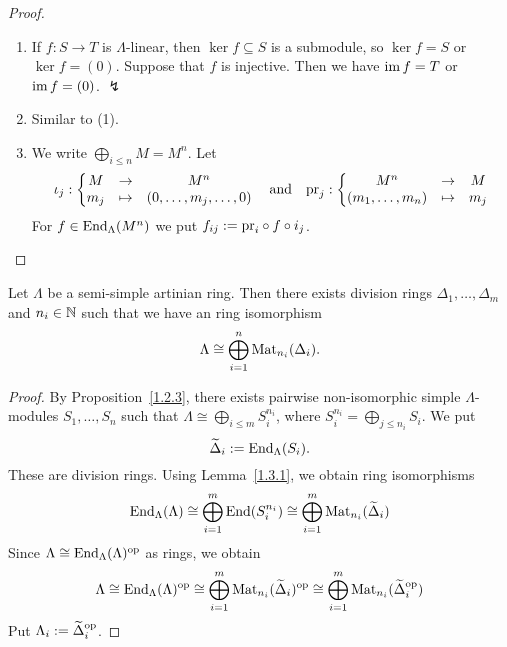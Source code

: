 
\begin{proof}\
\begin{enumerate}
\item If $f:S\to T$ is $\Lambda$-linear, then $\ker f\subseteq S$ is a submodule, so $\ker f=S$ or $\ker f=(0)$. Suppose that $f$ is injective. Then we have $\operatorname{im} f=T$ or $\operatorname{im} f=(0)$. $\lightning$
\item Similar to (1).
\item We write $\bigoplus_{i\le n} M = M^n$. Let
\[
\iota_j:
\left\{
\begin{matrix}
M & \to & M^n \\
m_j & \mapsto & (0,\dots,m_j,\dots,0)
\end{matrix}
\right.
\quad\text{and}\quad
\mathrm{pr}_j:
\left\{
\begin{matrix}
M^n & \to & M \\
(m_1,\dots,m_n) & \mapsto & m_j
\end{matrix}
\right.
\]
For $f\in\operatorname{End}_\Lambda(M^n)$ we put $f_{ij}:=\mathrm{pr}_i \circ f \circ i_j$.\qedhere
\end{enumerate}
\end{proof}


\begin{theorem}\label{1.3.2}
Let $\Lambda$ be a semi-simple artinian ring. Then there exists division rings $\Delta_1,\dots,\Delta_m$ and $n_i\in\mathbb{N}$ such that we have an ring isomorphism
\[
\Lambda \cong \bigoplus_{i=1}^n \operatorname{Mat}_{n_i}(\Delta_i).
\]
\end{theorem}


\begin{proof}
By Proposition~\ref{1.2.3}, there exists pairwise non-isomorphic simple $\Lambda$-modules $S_1,\dots,S_n$ such that $\Lambda \cong \bigoplus_{i\le m} S_i^{n_i}$, where $S_i^{n_i}=\bigoplus_{j\le n_i} S_i$. We put
\[
\widetilde \Delta_i := \operatorname{End}_\Lambda(S_i).
\]
These are division rings. Using Lemma~\ref{1.3.1}, we obtain ring isomorphisms
\[
\operatorname{End}_\Lambda(\Lambda)
 \cong \bigoplus_{i=1}^m \operatorname{End}(S_i^{n_i})
 \cong \bigoplus_{i=1}^m \operatorname{Mat}_{n_i} (\widetilde \Delta_i)
\]
Since $\Lambda \cong \operatorname{End}_\Lambda(\Lambda)^{\mathrm{op}}$ as rings, we obtain
\[
\Lambda
 \cong \operatorname{End}_\Lambda(\Lambda)^{\mathrm{op}}
 \cong \bigoplus_{i=1}^m \operatorname{Mat}_{n_i} (\widetilde \Delta_i)^{\mathrm{op}}
 \cong \bigoplus_{i=1}^m \operatorname{Mat}_{n_i} (\widetilde \Delta_i^{\mathrm{op}})
\]
Put $\Lambda_i:=\widetilde \Delta_i^{\mathrm{op}}$.
\end{proof}

